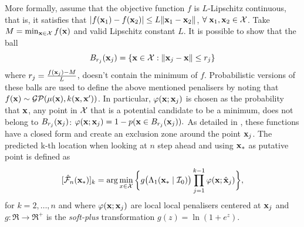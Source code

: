 \documentclass[twoside]{article}
\newcommand{\I}{\mathcal{I}}
\newcommand{\GP}{\mathcal{GP}}
\newcommand{\future}{\mathcal{F}}
\begin{document}
More formally, assume that the objective function $f$ is $L$-Lipschitz continuous, that is, it satisfies that $|f(\mathbf{x}_1) - f(\mathbf{x}_2) | \leq L \|\mathbf{x}_1 -\mathbf{x}_2 \|$, $\forall\; \mathbf{x}_1,\mathbf{x}_2\in\mathcal{X}$. Take $M = \min_{\mathbf{x} \in {\mathcal{X}}} f(\mathbf{x})$ and valid Lipschitz constant $L$. It is possible to show that  the ball
\begin{equation}\label{eq:radious}
B_{r_j}(\mathbf{x}_j)= \{\mathbf{x}\in \mathcal{X} : \|\mathbf{x}_j-\mathbf{x} \| \leq r_j \}
\end{equation}
where $r_j = \frac{f(\mathbf{x}_j)-M}{L}$, doesn't contain the minimum of $f$. Probabilistic versions of these balls are used to define the above mentioned penalisers by noting that $\latentForce(\latentVector) \sim \GP(\mu(\latentVector),k(\latentVector,\latentVector'))$. In particular, $\varphi(\mathbf{x};\mathbf{x}_j)$ is chosen as the probability that $\mathbf{x}$, any point in $\mathcal{X}$ that is a potential candidate to be a minimum, does not belong to $B_{r_j}(\mathbf{x}_j)$: $\varphi(\mathbf{x};\mathbf{x}_j)  = 1- p (\mathbf{x}  \in B_{r_j}(\mathbf{x}_j)).$
As detailed in \cite{gonzalez2015batch}, these functions have a closed form and create an exclusion zone around the point $\mathbf{x}_j$. The predicted k-th location when looking at $n$ step ahead and using $\mathbf{x}_*$ as putative point is defined as
\begin{equation}\label{eq:penalized_acquisition}
 [\hat{\future}_n(\latentVector_*)]_k  =
 \arg \min_{x \in \inputSpace}\, \biggl\{g \bigl(\Lambda_1(\latentVector_* \mid \I_0) \bigr)\prod_{j=1}^{k-1}\varphi(\latentVector;\hat{\latentVector}_{j})\biggr\},
\end{equation}
for $k=2,\dots,n$ and where $\varphi(\mathbf{x};\mathbf{x}_{j})$ are local local penalisers centered at $\mathbf{x}_{j}$ and $g:\Re \rightarrow \Re^+$ is the \emph{soft-plus} transformation $g(z)= \ln(1+e^z)$.
\end{document}
